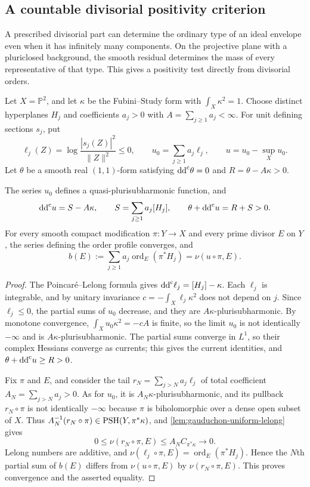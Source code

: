 \subsection{A countable divisorial positivity criterion}
\label{subsec:countable-divisorial-positivity}

A prescribed divisorial part can determine the ordinary type of an
ideal envelope even when it has infinitely many components.
On the projective plane with a pluriclosed background, the
smooth residual determines the mass of every representative of that type.
This gives a positivity test directly from divisorial orders.

Let $X=\mathbb P^2$, and let $\kappa$ be the Fubini--Study form
with $\int_X\kappa^2=1$. Choose distinct hyperplanes $H_j$ and
coefficients $a_j>0$ with $A=\sum_{j\geq1}a_j<\infty$.
For unit defining sections $s_j$, put
\[
 \ell_j(Z)=\log\frac{|s_j(Z)|^2}{\|Z\|^2}\leq0,
 \qquad u_0=\sum_{j\geq1}a_j\ell_j,
 \qquad u=u_0-\sup_Xu_0.
\]
Let $\theta$ be a smooth real $(1,1)$-form satisfying
$\mathrm{dd}^{\mathrm{c}}\theta=0$ and $R=\theta-A\kappa>0$.

\begin{lemma}\label{countable-divisorial:profile}
The series $u_0$ defines a quasi-plurisubharmonic function, and
\[
 \mathrm{dd}^{\mathrm{c}} u=S-A\kappa,\qquad
 S=\sum_{j\geq1}a_j[H_j],\qquad
 \theta+\mathrm{dd}^{\mathrm{c}} u=R+S>0.
\]
For every smooth compact modification $\pi\colon Y\to X$ and
every prime divisor $E$ on $Y$, the series defining the order
profile converges, and
\[
 b(E):=\sum_{j\geq1}a_j\operatorname{ord}_E(\pi^*H_j)
       =\nu(u\circ\pi,E).
\]
\end{lemma}
\begin{proof}
The Poincar\'e--Lelong formula gives
$\mathrm{dd}^{\mathrm{c}}\ell_j=[H_j]-\kappa$. Each $\ell_j$ is integrable, and by
unitary invariance $c=-\int_X\ell_j\kappa^2$ does not depend on $j$.
Since $\ell_j\leq0$, the partial sums of $u_0$ decrease, and
they are $A\kappa$-plurisubharmonic. By monotone convergence,
$\int_Xu_0\kappa^2=-cA$ is finite, so the limit $u_0$ is
not identically $-\infty$ and is $A\kappa$-plurisubharmonic.
The partial sums converge in $L^1$, so their complex Hessians
converge as currents; this gives the current identities, and
$\theta+\mathrm{dd}^{\mathrm{c}} u\geq R>0$.

Fix $\pi$ and $E$, and consider the tail
$r_N=\sum_{j>N}a_j\ell_j$ of total coefficient
$A_N=\sum_{j>N}a_j>0$. As for $u_0$, it is
$A_N\kappa$-plurisubharmonic, and its pullback $r_N\circ\pi$ is
not identically $-\infty$ because $\pi$ is biholomorphic over a
dense open subset of $X$. Thus
$A_N^{-1}(r_N\circ\pi)\in\mathrm{PSH}(Y,\pi^*\kappa)$, and
\cref{lem:gauduchon-uniform-lelong} gives
\[
 0\leq\nu(r_N\circ\pi,E)\leq A_NC_{\pi^*\kappa}\longrightarrow0.
\]
Lelong numbers are additive, and
$\nu(\ell_j\circ\pi,E)=\operatorname{ord}_E(\pi^*H_j)$.
Hence the $N$th partial sum of $b(E)$ differs from
$\nu(u\circ\pi,E)$ by $\nu(r_N\circ\pi,E)$.
This proves convergence and the asserted equality.
\end{proof}

